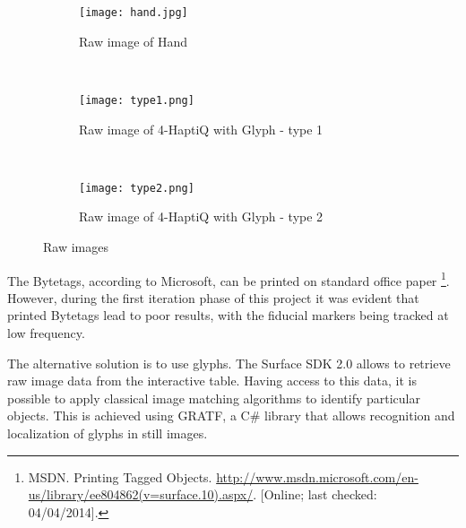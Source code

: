 \begin{figure}
        \centering
        \begin{subfigure}[H]{0.3\textwidth}
                \texttt{[image: hand.jpg]}
                \caption{Raw image of Hand}
                \label{fig:rawHand}
        \end{subfigure}%
        ~ %
        \begin{subfigure}[H]{0.3\textwidth}
                \texttt{[image: type1.png]}
                \caption{Raw image of 4-HaptiQ with Glyph - type 1}
                \label{fig:rawHaptiQ1}
        \end{subfigure}
        ~ %
        \begin{subfigure}[H]{0.3\textwidth}
                \texttt{[image: type2.png]}
                \caption{Raw image of 4-HaptiQ with Glyph - type 2}
                \label{fig:rawHaptiQ2}
        \end{subfigure}
        \caption{Raw images}\label{fig:rawImages}
\end{figure}

The Bytetags, according to Microsoft, can be printed on standard office paper \footnote{MSDN. Printing Tagged Objects. \url{http://www.msdn.microsoft.com/en-us/library/ee804862(v=surface.10).aspx/}. [Online; last checked: 04/04/2014].}. However, during the first iteration phase of this project it was evident that printed Bytetags lead to poor results, with the fiducial markers being tracked at low frequency.

The alternative solution is to use glyphs. The Surface SDK 2.0 allows to retrieve raw image data from the interactive table. Having access to this data, it is possible to apply classical image matching algorithms to identify particular objects. This is achieved using GRATF, a C\# library that allows recognition and localization of glyphs in still images. 

